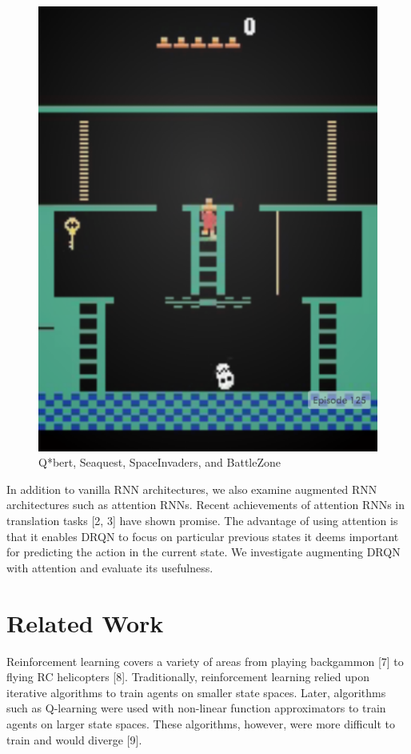 \documentclass{article}
\begin{document}
\begin{figure}[h]
\begin{minipage}{0.8\textwidth}
            \centering
            \includegraphics[scale=0.15]{MontezumaRevenge}
        \end{minipage}
        \caption{Q*bert, Seaquest, SpaceInvaders, and BattleZone}
    \end{figure}


    In addition to vanilla RNN architectures, we also examine augmented RNN
    architectures such as attention RNNs. Recent achievements of attention RNNs in
    translation tasks [2, 3] have shown promise. The advantage of using attention
    is that it enables DRQN to focus on particular previous states it deems
    important for predicting the action in the current state. We investigate
    augmenting DRQN with attention and evaluate its usefulness.

\section{Related Work}

Reinforcement learning covers a variety of areas from playing backgammon [7] to
flying RC helicopters [8]. Traditionally, reinforcement learning relied upon
iterative algorithms to train agents on smaller state spaces. Later, algorithms
such as Q-learning were used with non-linear function approximators to train agents
on larger state spaces. These algorithms, however, were more difficult to train
and would diverge [9].
\end{document}
